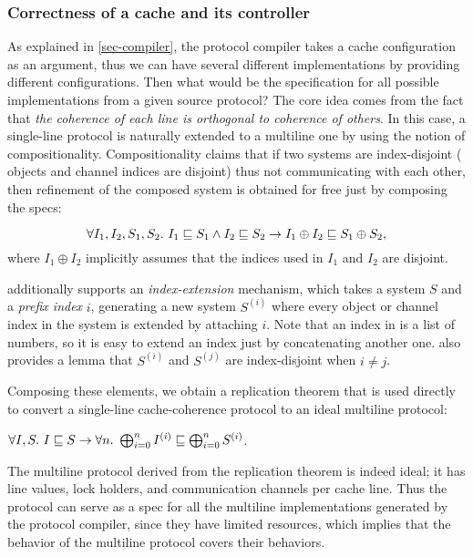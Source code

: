 \subsubsection{Correctness of a cache and its controller}

As explained in \autoref{sec-compiler}, the protocol compiler takes a cache configuration as an argument, thus we can have several different implementations by providing different configurations.
Then what would be the specification for all possible implementations from a given source protocol?
The core idea comes from the fact that \emph{the coherence of each line is orthogonal to coherence of others}.
In this case, a single-line \hemiola{} protocol is naturally extended to a multiline one by using the notion of compositionality.
Compositionality claims that if two systems are index-disjoint (\ie{} objects and channel indices are disjoint) thus not communicating with each other, then refinement of the composed system is obtained for free just by composing the specs:
\begin{theorem}[Compositionality]
  \begin{displaymath}
    \forall I_1, I_2, S_1, S_2.\ \refines{I_1}{S_1} \land \refines{I_2}{S_2} \to
    \refines{I_1 \oplus I_2}{S_1 \oplus S_2},
  \end{displaymath}
  where $I_1 \oplus I_2$ implicitly assumes that the indices used in $I_1$ and $I_2$ are disjoint.
\end{theorem}

\hemiola{} additionally supports an \emph{index-extension} mechanism, which takes a system $S$ and a \emph{prefix index} $i$, generating a new system $S^{(i)}$ where every object or channel index in the system is extended by attaching $i$.
Note that an index in \hemiola{} is a list of numbers, so it is easy to extend an index just by concatenating another one.
\hemiola{} also provides a lemma that $S^{(i)}$ and $S^{(j)}$ are index-disjoint when $i \neq j$.

Composing these elements, we obtain a replication theorem that is used directly to convert a single-line cache-coherence protocol to an ideal multiline protocol:
\begin{theorem}[Replication]
  $\forall I, S.\ I \sqsubseteq S \to \forall n.\ \bigoplus^{n}_{i=0} I^{(i)} \sqsubseteq \bigoplus^{n}_{i=0} S^{(i)}$.
  \label{thm-replication}
\end{theorem}

The multiline protocol derived from the replication theorem is indeed ideal; it has line values, lock holders, and communication channels per cache line.
Thus the protocol can serve as a spec for all the multiline implementations generated by the protocol compiler, since they have limited resources, which implies that the behavior of the multiline protocol covers their behaviors.


